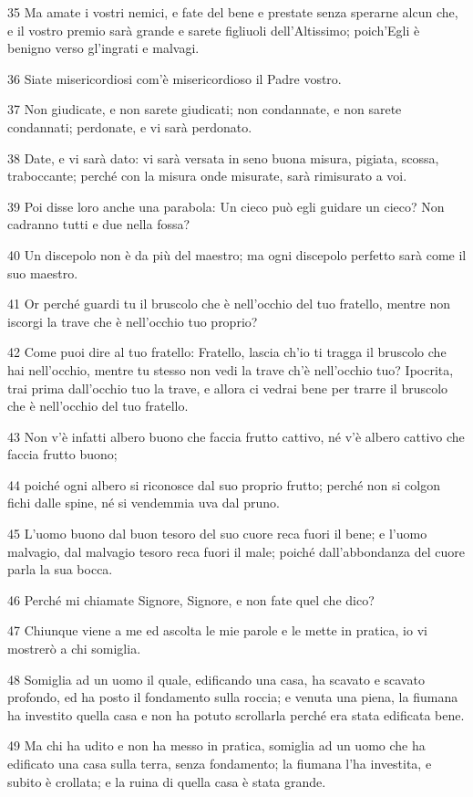 \par 35 Ma amate i vostri nemici, e fate del bene e prestate senza sperarne alcun che, e il vostro premio sarà grande e sarete figliuoli dell'Altissimo; poich'Egli è benigno verso gl'ingrati e malvagi.
\par 36 Siate misericordiosi com'è misericordioso il Padre vostro.
\par 37 Non giudicate, e non sarete giudicati; non condannate, e non sarete condannati; perdonate, e vi sarà perdonato.
\par 38 Date, e vi sarà dato: vi sarà versata in seno buona misura, pigiata, scossa, traboccante; perché con la misura onde misurate, sarà rimisurato a voi.
\par 39 Poi disse loro anche una parabola: Un cieco può egli guidare un cieco? Non cadranno tutti e due nella fossa?
\par 40 Un discepolo non è da più del maestro; ma ogni discepolo perfetto sarà come il suo maestro.
\par 41 Or perché guardi tu il bruscolo che è nell'occhio del tuo fratello, mentre non iscorgi la trave che è nell'occhio tuo proprio?
\par 42 Come puoi dire al tuo fratello: Fratello, lascia ch'io ti tragga il bruscolo che hai nell'occhio, mentre tu stesso non vedi la trave ch'è nell'occhio tuo? Ipocrita, trai prima dall'occhio tuo la trave, e allora ci vedrai bene per trarre il bruscolo che è nell'occhio del tuo fratello.
\par 43 Non v'è infatti albero buono che faccia frutto cattivo, né v'è albero cattivo che faccia frutto buono;
\par 44 poiché ogni albero si riconosce dal suo proprio frutto; perché non si colgon fichi dalle spine, né si vendemmia uva dal pruno.
\par 45 L'uomo buono dal buon tesoro del suo cuore reca fuori il bene; e l'uomo malvagio, dal malvagio tesoro reca fuori il male; poiché dall'abbondanza del cuore parla la sua bocca.
\par 46 Perché mi chiamate Signore, Signore, e non fate quel che dico?
\par 47 Chiunque viene a me ed ascolta le mie parole e le mette in pratica, io vi mostrerò a chi somiglia.
\par 48 Somiglia ad un uomo il quale, edificando una casa, ha scavato e scavato profondo, ed ha posto il fondamento sulla roccia; e venuta una piena, la fiumana ha investito quella casa e non ha potuto scrollarla perché era stata edificata bene.
\par 49 Ma chi ha udito e non ha messo in pratica, somiglia ad un uomo che ha edificato una casa sulla terra, senza fondamento; la fiumana l'ha investita, e subito è crollata; e la ruina di quella casa è stata grande.

